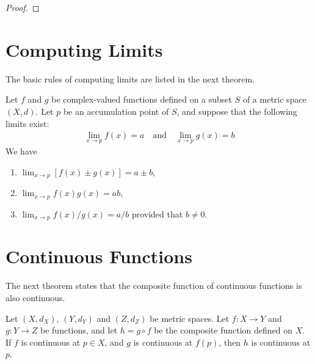 \documentclass[thmcnt=section, 12pt]{my-elegantbook}
\begin{document}
\begin{proof}
\end{proof}


\section{Computing Limits}

The basic rules of computing limits are listed in the next theorem.

\begin{theorem}
    Let $f$ and $g$ be complex-valued functions defined on a subset $S$ of a metric space $(X,d)$. Let $p$ be an accumulation point of $S$, and suppose that the following limits exist:
    \begin{align*}
        \lim_{x \to p} f(x) = a
        \quad \text{and} \quad
        \lim_{x \to p} g(x) = b
    \end{align*}
    We have
    \begin{enumerate}
        \item $\lim_{x \to p}[f(x) \pm g(x)] = a \pm b$,
        \item $\lim_{x \to p}f(x) g(x) = a b$,
        \item $\lim_{x \to p} f(x) / g(x) = a / b$ provided that $b \neq 0$.
    \end{enumerate}
\end{theorem}


\section{Continuous Functions}


The next theorem states that the composite function of continuous functions is also continuous.

\begin{theorem} \label{thm:3}
    Let $(X, d_X)$, $(Y, d_Y)$ and $(Z, d_Z)$ be metric spaces. Let $f: X \to Y$ and $g: Y \to Z$ be functions, and let $h = g \circ f$ be the composite function defined on $X$. If $f$ is continuous at $p \in X$, and $g$ is continuous at $f(p)$, then $h$ is continuous at $p$.
\end{theorem}
\end{document}
